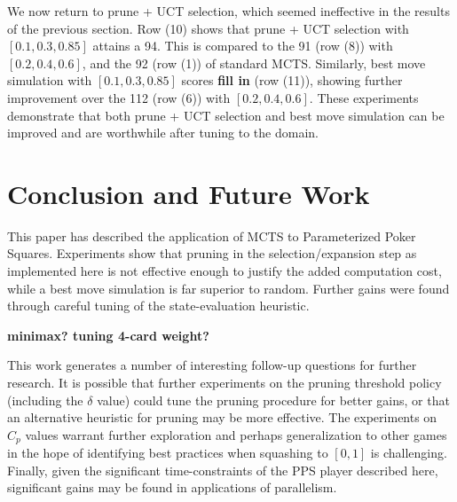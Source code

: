 \documentclass[letterpaper]{article}
\begin{document}
We now return to prune + UCT selection, which seemed ineffective in the results of the previous section. Row (10) shows that prune + UCT selection with $[0.1, 0.3, 0.85]$ attains a 94. This is compared to the 91 (row (8)) with $[0.2, 0.4, 0.6]$, and the 92 (row (1)) of standard MCTS. Similarly, best move simulation with $[0.1, 0.3, 0.85]$ scores {\bf fill in} (row (11)), showing further improvement over the 112 (row (6)) with $[0.2, 0.4, 0.6]$. These experiments demonstrate that both prune + UCT selection and best move simulation can be improved and are worthwhile after tuning to the domain.




\section{Conclusion and Future Work}

This paper has described the application of MCTS to Parameterized Poker Squares. Experiments show that pruning in the selection/expansion step as implemented here is not effective enough to justify the added computation cost, while a best move simulation is far superior to random. Further gains were found through careful tuning of the state-evaluation heuristic.

{\bf minimax? tuning 4-card weight?}

This work generates a number of interesting follow-up questions for further research. It is possible that further experiments on the pruning threshold policy (including the $\delta$ value) could tune the pruning procedure for better gains, or that an alternative heuristic for pruning may be more effective. The experiments on $C_p$ values warrant further exploration and perhaps generalization to other games in the hope of identifying best practices when squashing to $[0,1]$ is challenging. Finally, given the significant time-constraints of the PPS player described here, significant gains may be found in applications of parallelism.
\end{document}
